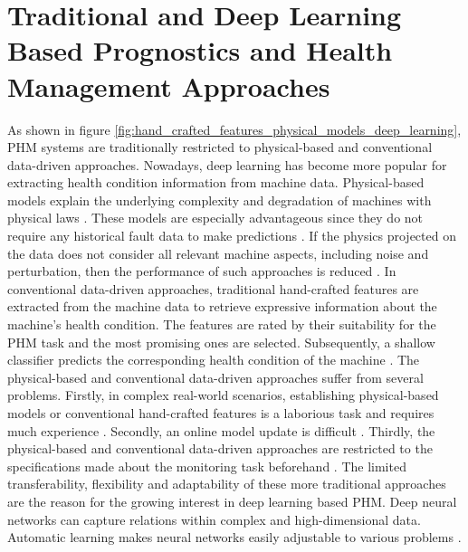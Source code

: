 \section{Traditional and Deep Learning Based Prognostics and Health Management Approaches}
As shown in figure \ref{fig:hand_crafted_features_physical_models_deep_learning}, PHM systems are traditionally restricted to physical-based and conventional data-driven approaches. Nowadays, deep learning has become more popular for extracting health condition information from machine data. Physical-based models explain the underlying complexity and degradation of machines with physical laws \cite{ZHAO2019213}. These models are especially advantageous since they do not require any historical fault data to make predictions \cite{Benker2019}. If the physics projected on the data does not consider all relevant machine aspects, including noise and perturbation, then the performance of such approaches is reduced \cite{ZHAO2019213}. In conventional data-driven approaches, traditional hand-crafted features are extracted from the machine data to retrieve expressive information about the machine's health condition. The features are rated by their suitability for the PHM task and the most promising ones are selected. Subsequently, a shallow classifier predicts the corresponding health condition of the machine \cite{ZHAO2019213}. The physical-based and conventional data-driven approaches suffer from several problems. Firstly, in complex real-world scenarios, establishing physical-based models or conventional hand-crafted features is a laborious task and requires much experience \cite{ZHAO2019213}. Secondly, an online model update is difficult \cite{ZHAO2019213}. Thirdly, the physical-based and conventional data-driven approaches are restricted to the specifications made about the monitoring task beforehand \cite{ZHAO2019213}. The limited transferability, flexibility and adaptability of these more traditional approaches are the reason for the growing interest in deep learning based PHM. Deep neural networks can capture relations within complex and high-dimensional data. Automatic learning makes neural networks easily adjustable to various problems \cite{ZHAO2019213}.
